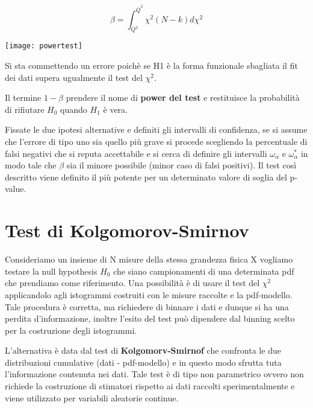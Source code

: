 \begin{minipage}{.4\textwidth}
	\begin{equation}
		\beta = \int_{Q^2}^{\overline{Q}^2}\chi^2(N-k)d\chi^2 
	\end{equation}
  \end{minipage}
  \begin{minipage}{.4\textwidth}
    \centering
    \texttt{[image: powertest]}	
  \end{minipage}
\vspace{0.2in}

Si sta commettendo un errore poich\`{e} se H1 \`{e} la forma funzionale sbagliata il fit dei dati supera ugualmente il test del $\chi^2$. 

\noindent Il termine $1-\beta$ prendere il nome di \textbf{power del test} e restituisce la probabilit\`{a} di rifiutare $H_0$ quando $H_1$ \`{e} vera.
\newline

\noindent Fissate le due ipotesi alternative e definiti gli intervalli di confidenza, se si assume che l'errore di tipo uno sia quello pi\`{u} grave si procede scegliendo la percentuale di falsi negativi che si reputa accettabile e si cerca di definire gli intervalli $\omega_\alpha$ e $\omega_\alpha^*$ in modo tale che $\beta$ sia il minore possibile (minor caso di falsi positivi). Il test cos\`{i} descritto viene definito il pi\`{u} potente per un determinato valore di soglia del p-value.

\section{Test di Kolgomorov-Smirnov}

Consideriamo un insieme di N misure della stessa grandezza fisica X vogliamo testare la null hypothesis $H_0$ che siano campionamenti di una determinata pdf che prendiamo come riferimento. Una possibilit\`{a} \`{e} di usare il test del $\chi^2$ applicandolo agli istogrammi costruiti con le misure raccolte e la pdf-modello. Tale procedura \`{e} corretta, ma richiedere di binnare i dati e dunque si ha una perdita d'informazione, inoltre l'esito del test pu\`{o} dipendere dal binning scelto per la costruzione degli istogrammi.

L'alternativa \`{e} data dal test di \textbf{Kolgomorv-Smirnof} che confronta le due distribuzioni cumulative (dati - pdf-modello) e in questo modo sfrutta tuta l'informazione contenuta nei dati. Tale test \`{e} di tipo non parametrico ovvero non richiede la costruzione di stimatori rispetto ai dati raccolti sperimentalmente e viene utilizzato per variabili aleatorie continue. 


